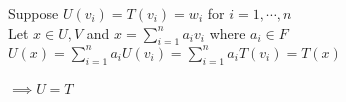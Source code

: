 Suppose $U(v_i)=T(v_i)=w_i$ for $i=1,\cdots,n$ \\
Let $x \in U,V$ and $x = \sum^n_{i=1}a_iv_i$ where $a_i \in F$ \\
$U(x) = \sum^n_{i=1}a_iU(v_i) = \sum^n_{i=1}a_iT(v_i)=T(x)$ \\
\\$\implies U=T$